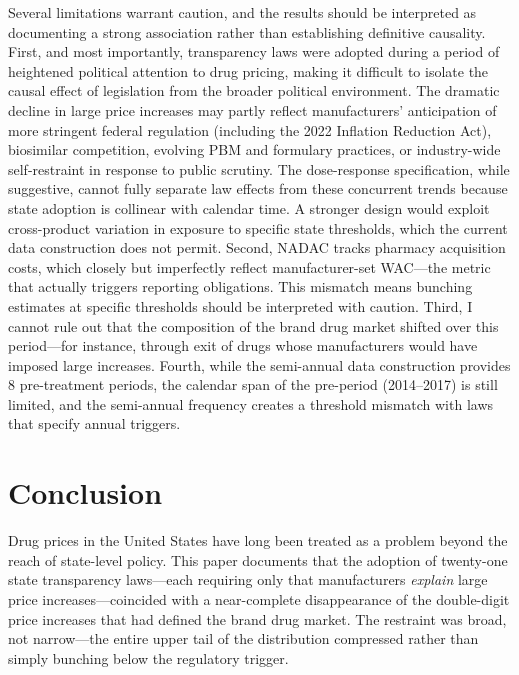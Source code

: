 \documentclass[12pt]{article}
\begin{document}
Several limitations warrant caution, and the results should be interpreted as documenting a strong association rather than establishing definitive causality. First, and most importantly, transparency laws were adopted during a period of heightened political attention to drug pricing, making it difficult to isolate the causal effect of legislation from the broader political environment. The dramatic decline in large price increases may partly reflect manufacturers' anticipation of more stringent federal regulation (including the 2022 Inflation Reduction Act), biosimilar competition, evolving PBM and formulary practices, or industry-wide self-restraint in response to public scrutiny. The dose-response specification, while suggestive, cannot fully separate law effects from these concurrent trends because state adoption is collinear with calendar time. A stronger design would exploit cross-product variation in exposure to specific state thresholds, which the current data construction does not permit. Second, NADAC tracks pharmacy acquisition costs, which closely but imperfectly reflect manufacturer-set WAC---the metric that actually triggers reporting obligations. This mismatch means bunching estimates at specific thresholds should be interpreted with caution. Third, I cannot rule out that the composition of the brand drug market shifted over this period---for instance, through exit of drugs whose manufacturers would have imposed large increases. Fourth, while the semi-annual data construction provides 8 pre-treatment periods, the calendar span of the pre-period (2014--2017) is still limited, and the semi-annual frequency creates a threshold mismatch with laws that specify annual triggers.


\section{Conclusion}

Drug prices in the United States have long been treated as a problem beyond the reach of state-level policy. This paper documents that the adoption of twenty-one state transparency laws---each requiring only that manufacturers \textit{explain} large price increases---coincided with a near-complete disappearance of the double-digit price increases that had defined the brand drug market. The restraint was broad, not narrow---the entire upper tail of the distribution compressed rather than simply bunching below the regulatory trigger.
\end{document}
